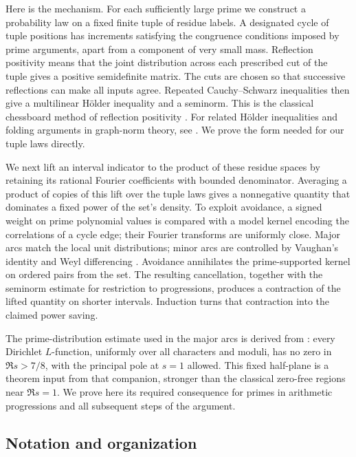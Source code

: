 Here is the mechanism. For each sufficiently large prime we construct
a probability law on a fixed finite tuple of residue labels. A
designated cycle of tuple positions has increments satisfying the
congruence conditions imposed by prime arguments, apart from a component
of very small mass. Reflection positivity means that the joint distribution across
each prescribed cut of the tuple gives a positive semidefinite matrix.
The cuts are chosen so that successive reflections can make all inputs
agree. Repeated Cauchy--Schwarz inequalities then give a multilinear
H\"older inequality and a seminorm. This is the classical chessboard
method of reflection positivity
\cite[Theorem~4.1]{FILS1978}. For related H\"older inequalities and
folding arguments in graph-norm theory, see
\cite{Hatami2010,ConlonLee2017}. We prove the form needed for our
tuple laws directly.

We next lift an interval indicator to the product of these residue
spaces by retaining its rational Fourier coefficients with bounded
denominator. Averaging a product of copies of this lift over the tuple
laws gives a nonnegative quantity that dominates a fixed power of the
set's density. To exploit avoidance, a signed weight on prime polynomial
values is compared with a model kernel encoding the correlations of a
cycle edge; their Fourier transforms are uniformly close. Major arcs match the local
unit distributions; minor arcs are controlled by Vaughan's identity
and Weyl differencing \cite{Vaughan1980,Vaughan1997,Weyl1916}.
Avoidance annihilates the prime-supported kernel on ordered pairs from the set.
The resulting cancellation, together with the seminorm estimate for
restriction to progressions, produces a contraction of the lifted
quantity on shorter intervals. Induction turns that contraction into
the claimed power saving.

The prime-distribution estimate used in the major arcs is derived from
\cite[Theorem~1.1]{ZeroFree}: every Dirichlet $L$-function, uniformly
over all characters and moduli, has no zero in $\Re s>7/8$, with the
principal pole at $s=1$ allowed. This fixed half-plane is a theorem input
from that companion, stronger than the classical zero-free regions
near $\Re s=1$. We prove here its required consequence for primes in
arithmetic progressions and all subsequent steps of the argument.

\subsection{Notation and organization}

